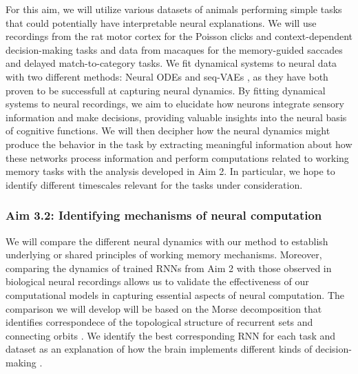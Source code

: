 \documentclass[12pt,letterpaper, onecolumn]{article}
\theoremstyle{definition}
\theoremstyle{remark}
\begin{document}
For this aim, we will utilize various datasets of animals performing simple tasks that could potentially have interpretable neural explanations.
We will use recordings from the rat motor cortex for the Poisson clicks and context-dependent decision-making tasks and data from macaques for the memory-guided saccades and delayed match-to-category tasks.
%
We fit dynamical systems to neural data \citep{Zhao2016d} with two different methods:
 Neural ODEs \citep{kim2021inferring} and 
 seq-VAEs \citep{pandarinath2018inferring}, as they have both proven to be successfull at capturing neural dynamics.
By fitting dynamical systems to neural recordings, we aim to elucidate how neurons integrate sensory information and make decisions, providing valuable insights into the neural basis of cognitive functions.
We will then decipher how the neural dynamics might produce the behavior in the task by extracting meaningful information about how these networks process information and perform computations related to working memory tasks with the analysis developed in Aim 2. 
In particular, we hope to identify different timescales relevant for the tasks under consideration.

\subsubsection*{Aim 3.2: Identifying mechanisms of neural computation}
We will compare the different neural dynamics with our method to establish underlying or shared principles of working memory mechanisms.
Moreover, comparing the dynamics of trained RNNs from Aim 2 with those observed in biological neural recordings allows us to validate the effectiveness of our computational models in capturing essential aspects of neural computation.
 The comparison we will develop will be based on the Morse decomposition that identifies correspondece of the topological structure of recurrent sets and connecting orbits \citep{arai2009database, kaczynski2004computational}.
We identify the best corresponding RNN for each task and dataset as an explanation of how the brain implements different kinds of decision-making \citep{levenstein2023}.
 




\newpage
\printbibliography
\end{document}
